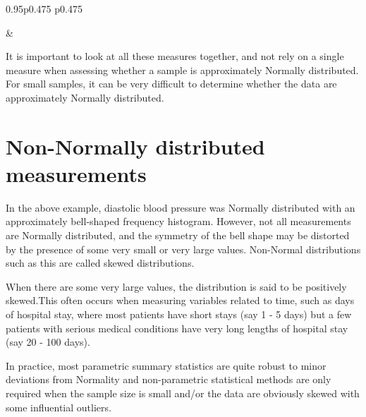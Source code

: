 \documentclass[
]{memoir}
\begin{document}
\begin{table}[ht]
\begin{centerbox}
\begin{threeparttable}
\begin{tabularx}{0.95\textwidth}{p{} p{}}
\hhline{}

 &
 \tabularnewline[-0.5pt]


\end{tabularx}
\end{threeparttable}\par\end{centerbox}

\end{table}
 

It is important to look at all these measures together, and not rely on a single measure when assessing whether a sample is approximately Normally distributed. For small samples, it can be very difficult to determine whether the data are approximately Normally distributed.

\hypertarget{non-normally-distributed-measurements}{%
\section{Non-Normally distributed measurements}\label{non-normally-distributed-measurements}}

In the above example, diastolic blood pressure was Normally distributed with an approximately bell-shaped frequency histogram. However, not all measurements are Normally distributed, and the symmetry of the bell shape may be distorted by the presence of some very small or very large values. Non-Normal distributions such as this are called skewed distributions.

When there are some very large values, the distribution is said to be positively skewed.This often occurs when measuring variables related to time, such as days of hospital stay, where most patients have short stays (say 1 - 5 days) but a few patients with serious medical conditions have very long lengths of hospital stay (say 20 - 100 days).

In practice, most parametric summary statistics are quite robust to minor deviations from Normality and non-parametric statistical methods are only required when the sample size is small and/or the data are obviously skewed with some influential outliers.
\end{document}
